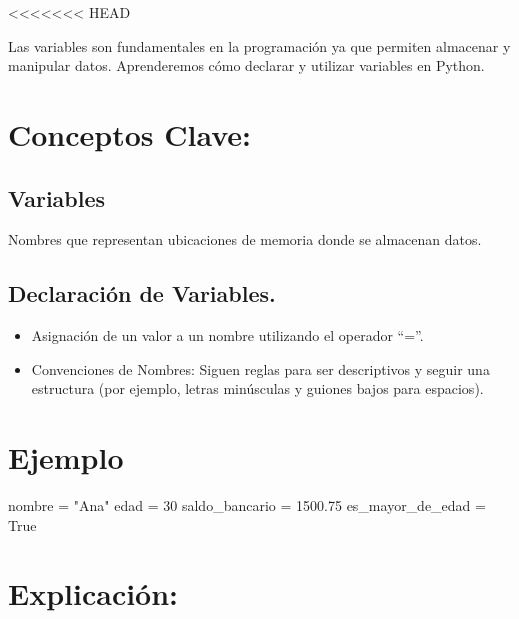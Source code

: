 \documentclass[
  a4paper,
  DIV=11,
  numbers=noendperiod,
  onepage,
  openany]{scrreprt}
\newenvironment{Shaded}{\begin{snugshade}}{\end{snugshade}}
\newcommand{\DecValTok}[1]{\textcolor[rgb]{0.68,0.00,0.00}{#1}}
\newcommand{\FloatTok}[1]{\textcolor[rgb]{0.68,0.00,0.00}{#1}}
\newcommand{\NormalTok}[1]{\textcolor[rgb]{0.00,0.23,0.31}{#1}}
\newcommand{\OperatorTok}[1]{\textcolor[rgb]{0.37,0.37,0.37}{#1}}
\newcommand{\StringTok}[1]{\textcolor[rgb]{0.13,0.47,0.30}{#1}}
\newcommand{\VariableTok}[1]{\textcolor[rgb]{0.07,0.07,0.07}{#1}}
\providecommand{\tightlist}{%
  \setlength{\itemsep}{0pt}\setlength{\parskip}{0pt}}\usepackage{longtable,booktabs,array}
\begin{document}
\textless\textless\textless\textless\textless\textless\textless{} HEAD

Las variables son fundamentales en la programación ya que permiten
almacenar y manipular datos. Aprenderemos cómo declarar y utilizar
variables en Python.

\hypertarget{conceptos-clave-10}{%
\section{Conceptos Clave:}\label{conceptos-clave-10}}

\hypertarget{variables-3}{%
\subsection{Variables}\label{variables-3}}

Nombres que representan ubicaciones de memoria donde se almacenan datos.

\hypertarget{declaraciuxf3n-de-variables.}{%
\subsection{Declaración de
Variables.}\label{declaraciuxf3n-de-variables.}}

\begin{itemize}
\tightlist
\item
  Asignación de un valor a un nombre utilizando el operador ``=''.
\item
  Convenciones de Nombres: Siguen reglas para ser descriptivos y seguir
  una estructura (por ejemplo, letras minúsculas y guiones bajos para
  espacios).
\end{itemize}

\hypertarget{ejemplo-10}{%
\section{Ejemplo}\label{ejemplo-10}}

\begin{Shaded}
\begin{Highlighting}[]
\NormalTok{nombre }\OperatorTok{=} \StringTok{"Ana"}
\NormalTok{edad }\OperatorTok{=} \DecValTok{30}
\NormalTok{saldo\_bancario }\OperatorTok{=} \FloatTok{1500.75}
\NormalTok{es\_mayor\_de\_edad }\OperatorTok{=} \VariableTok{True}
\end{Highlighting}
\end{Shaded}

\hypertarget{explicaciuxf3n-10}{%
\section{Explicación:}\label{explicaciuxf3n-10}}
\end{document}
